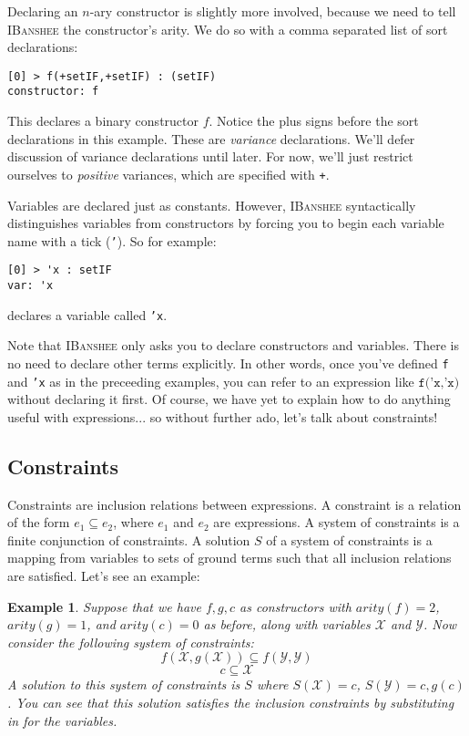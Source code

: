 \documentclass[10pt]{article}
\newcommand{\ibanshee}{\textsc{IBanshee}}
\newcommand{\var}[1]{\mathcal{#1}}
\newtheorem{example}{Example}
\begin{document}
Declaring an $n$-ary constructor is slightly more involved, because we
need to tell \ibanshee{} the constructor's arity. We do so with a
comma separated list of sort declarations:

\begin{verbatim}
[0] > f(+setIF,+setIF) : (setIF)
constructor: f
\end{verbatim}

This declares a binary constructor $f$. Notice the plus signs before
the sort declarations in this example. These are \emph{variance}
declarations. We'll defer discussion of variance declarations until
later. For now, we'll just restrict ourselves to \emph{positive}
variances, which are specified with \texttt{+}.

Variables are declared just as constants. However, \ibanshee{}
syntactically distinguishes variables from constructors by forcing you
to begin each variable name with a tick (\texttt{'}). So for example:

\begin{verbatim}
[0] > 'x : setIF
var: 'x
\end{verbatim}

declares a variable called \texttt{'x}.

Note that \ibanshee{} only asks you to declare constructors and
variables. There is no need to declare other terms explicitly. In
other words, once you've defined \texttt{f} and \texttt{'x} as in the
preceeding examples, you can refer to an expression like
$\texttt{f('x,'x)}$ without declaring it first. Of course, we have yet
to explain how to do anything useful with expressions... so without
further ado, let's talk about constraints!

\subsection{Constraints}

Constraints are inclusion relations between expressions. A constraint
is a relation of the form $e_1 \subseteq e_2$, where $e_1$ and $e_2$
are expressions. A system of constraints is a finite conjunction of
constraints. A solution $S$ of a system of constraints is a mapping
from variables to sets of ground terms such that all inclusion
relations are satisfied. Let's see an example:

\begin{example}
Suppose that we have $f,g,c$ as constructors with $arity(f) = 2$,
$arity(g) = 1$, and $arity(c) = 0$ as before, along with variables
$\var{X}$ and $\var{Y}$. Now consider the following system of
constraints:
\[
f(\var{X},g(\var{X})) \subseteq f(\var{Y},\var{Y})
\]
\[
c \subseteq \var{X}
\]
A solution to this system of constraints is $S$ where $S(\var{X}) =
{c}$, $S(\var{Y}) = {c,g(c)}$. You can see that this solution
satisfies the inclusion constraints by substituting in for the
variables.
\end{example}
\end{document}
